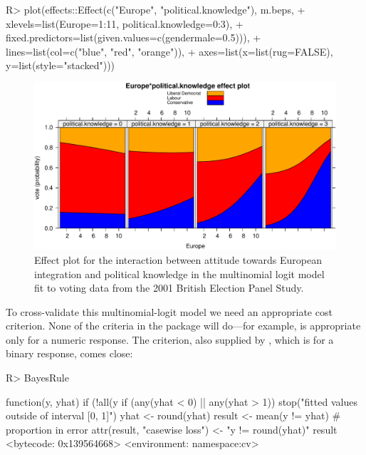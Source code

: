 \documentclass[
]{jss}
\begin{document}
\begin{CodeChunk}
\begin{CodeInput}
R> plot(effects::Effect(c("Europe", "political.knowledge"), m.beps,
+             xlevels=list(Europe=1:11, political.knowledge=0:3),
+             fixed.predictors=list(given.values=c(gendermale=0.5))),
+      lines=list(col=c("blue", "red", "orange")),
+      axes=list(x=list(rug=FALSE), y=list(style="stacked")))
\end{CodeInput}
\begin{figure}

{\centering \includegraphics{JSS-article-reduced-2_files/figure-latex/BEPS-plot-1} 

}

\caption[Effect plot for the interaction between attitude towards European integration and political knowledge in the multinomial logit model fit to voting data from the 2001 British Election Panel Study]{Effect plot for the interaction between attitude towards European integration and political knowledge in the multinomial logit model fit to voting data from the 2001 British Election Panel Study.}\label{fig:BEPS-plot}
\end{figure}
\end{CodeChunk}

To cross-validate this multinomial-logit model we need an appropriate
cost criterion. None of the criteria in the  package will
do---for example,  is appropriate only for a numeric
response. The  criterion, also supplied by ,
which is for a binary response, comes close:

\begin{CodeChunk}
\begin{CodeInput}
R> BayesRule
\end{CodeInput}
\begin{CodeOutput}
function(y, yhat){
  if (!all(y %
  if (any(yhat < 0) || any(yhat > 1)) stop("fitted values outside of interval [0, 1]")
  yhat <- round(yhat)
  result <- mean(y != yhat) # proportion in error
  attr(result, "casewise loss") <- "y != round(yhat)"
  result
}
<bytecode: 0x139564668>
<environment: namespace:cv>
\end{CodeOutput}
\end{CodeChunk}
\end{document}
